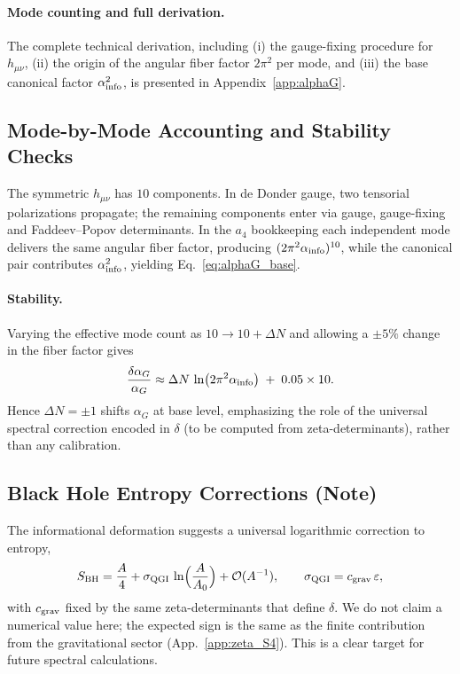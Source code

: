 \documentclass{article}
\numberwithin{equation}{section}
\theoremstyle{plain}
\theoremstyle{definition}
\theoremstyle{remark}
\begin{document}
\paragraph{Mode counting and full derivation.}
The complete technical derivation, including (i) the gauge-fixing procedure for $h_{\mu\nu}$, (ii) the origin of the angular fiber factor $2\pi^2$ per mode, and (iii) the base canonical factor $\alpha_{\rm info}^2$, is presented in Appendix~\ref{app:alphaG}.

\subsection{Mode-by-Mode Accounting and Stability Checks}
\label{subsec:grav_checks}
The symmetric $h_{\mu\nu}$ has $10$ components. In de Donder gauge, two tensorial polarizations propagate; the remaining components enter via gauge, gauge-fixing and Faddeev–Popov determinants. In the $a_4$ bookkeeping each independent mode delivers the same angular fiber factor, producing $(2\pi^2\alpha_{\rm info})^{10}$, while the canonical pair contributes $\alpha_{\rm info}^2$, yielding Eq.~\eqref{eq:alphaG_base}.

\paragraph{Stability.}
Varying the effective mode count as $10\to 10+\Delta N$ and allowing a $\pm 5\%$ change in the fiber factor gives
\[
\frac{\delta\alpha_G}{\alpha_G} \approx \Delta N\,\ln(2\pi^2\alpha_{\rm info}) \;+\; 0.05\times 10.
\]
Hence $\Delta N=\pm 1$ shifts $\alpha_G$ at base level, emphasizing the role of the universal spectral correction encoded in $\delta$ (to be computed from zeta-determinants), rather than any calibration.

\subsection{Black Hole Entropy Corrections (Note)}
\label{subsec:bh_entropy_note}
The informational deformation suggests a universal logarithmic correction to entropy,
\begin{equation}
S_{\rm BH}=\frac{A}{4}+\sigma_{\rm QGI}\,\ln\!\Big(\frac{A}{A_0}\Big)+\mathcal{O}(A^{-1}),
\qquad 
\sigma_{\rm QGI}=c_{\rm grav}\,\varepsilon,
\end{equation}
with $c_{\rm grav}$ fixed by the same zeta-determinants that define $\delta$.
We do not claim a numerical value here; the expected sign is the same as the finite contribution from the gravitational sector (App.~\ref{app:zeta_S4}). 
This is a clear target for future spectral calculations.
\end{document}
